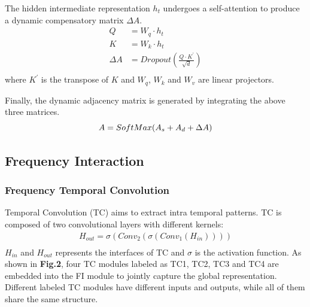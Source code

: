 \documentclass[final,12pt]{elsarticle}
\begin{document}
The hidden intermediate representation $h_{t}$ 
undergoes a self-attention 
to produce a dynamic compensatory matrix $\Delta A$.  %
\begin{equation}
  \begin{aligned}
    Q &= W_{q} \cdot h_{t}  \\
    K &= W_{k} \cdot h_{t}  \\
    \Delta A &= Dropout(\frac{Q \cdot K^{'}}{\sqrt{d}})  \\
  \end{aligned}
\end{equation}
where $K^{'}$ is the transpose of $K$ and 
$W_{q}$, $W_{k}$ and $W_{v}$ 
are linear projectors.  %


Finally, the dynamic adjacency matrix is generated 
by integrating the above three matrices.
\begin{equation}
  A = SoftMax(A_{s} + A_{d} + \Delta A)  \\
\end{equation}  %


\subsection{Frequency Interaction}
\label{subsec-4.4}


\subsubsection{Frequency Temporal Convolution}
\label{subsubsec-4.4.1}




Temporal Convolution (TC) aims to 
extract intra temporal patterns.  %
TC is composed of two convolutional layers with different kernels: 
\begin{equation}
  \begin{aligned}
    H_{out} = \sigma(Conv_{2}(\sigma(Conv_{1}(H_{in}))))  \\
  \end{aligned}
\end{equation}
$H_{in}$ and $H_{out}$ represents the interfaces of TC 
and $\sigma$ is the activation function.  %
As shown in \textbf{Fig.2},  %
four TC modules labeled as TC1, TC2, TC3 and TC4 are embedded into the FI module 
to jointly capture the global representation.  %
Different labeled TC modules have different inputs and outputs, 
while all of them share the same structure.
\end{document}
